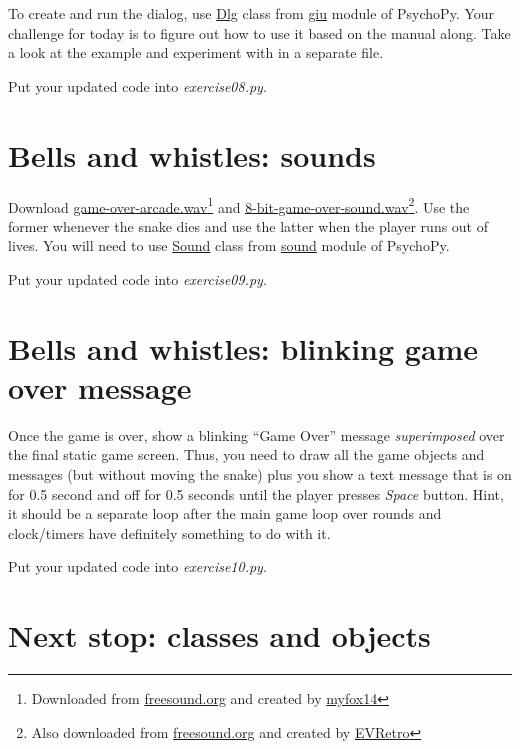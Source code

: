 \documentclass[
]{book}
\begin{document}
To create and run the dialog, use \href{https://www.psychopy.org/api/gui.html\#dlg}{Dlg} class from
\href{https://www.psychopy.org/api/gui.html}{giu} module of PsychoPy. Your challenge for today is to figure out how to use it based on the manual along. Take a look at the example and experiment with in a separate file.

Put your updated code into \emph{exercise08.py}.

\hypertarget{bells-and-whistles-sounds}{%
\section{Bells and whistles: sounds}\label{bells-and-whistles-sounds}}

Download \href{material/game-over-arcade.wav}{game-over-arcade.wav}\footnote{Downloaded from \href{https://freesound.org/}{freesound.org} and created by \href{https://freesound.org/people/myfox14/}{myfox14}} and \href{material/8-bit-game-over-sound.wav}{8-bit-game-over-sound.wav}\footnote{Also downloaded from \href{https://freesound.org/}{freesound.org} and created by \href{https://freesound.org/people/EVRetro/}{EVRetro}}. Use the former whenever the snake dies and use the latter when the player runs out of lives. You will need to use \href{https://www.psychopy.org/api/sound.html\#sound}{Sound} class from \href{https://www.psychopy.org/api/sound.html}{sound} module of PsychoPy.

Put your updated code into \emph{exercise09.py}.

\hypertarget{bells-and-whistles-blinking-game-over-message}{%
\section{Bells and whistles: blinking game over message}\label{bells-and-whistles-blinking-game-over-message}}

Once the game is over, show a blinking ``Game Over'' message \emph{superimposed} over the final static game screen. Thus, you need to draw all the game objects and messages (but without moving the snake) plus you show a text message that is on for 0.5 second and off for 0.5 seconds until the player presses \emph{Space} button. Hint, it should be a separate loop after the main game loop over rounds and clock/timers have definitely something to do with it.

Put your updated code into \emph{exercise10.py}.

\hypertarget{next-stop-classes-and-objects}{%
\section{Next stop: classes and objects}\label{next-stop-classes-and-objects}}
\end{document}
